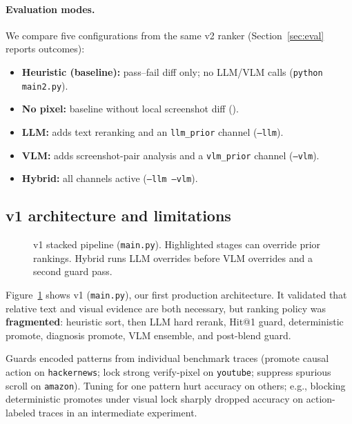 \documentclass[sigconf,nonacm]{acmart}
\begin{document}
\paragraph{Evaluation modes.}
We compare five configurations from the same v2 ranker (Section~\ref{sec:eval} reports outcomes):
\begin{itemize}
  \item \textbf{Heuristic (baseline):} pass--fail diff only; no LLM/VLM calls (\texttt{python main2.py}).
  \item \textbf{No pixel:} baseline without local screenshot diff ().
  \item \textbf{LLM:} adds text reranking and an \texttt{llm\_prior} channel (\texttt{--llm}).
  \item \textbf{VLM:} adds screenshot-pair analysis and a \texttt{vlm\_prior} channel (\texttt{--vlm}).
  \item \textbf{Hybrid:} all channels active (\texttt{--llm --vlm}).
\end{itemize}

\subsection{v1 architecture and limitations}
\label{sec:v1}

\begin{figure}[t]
  \centering
  \resizebox{0.92\linewidth}{!}{%
  }
  \caption{v1 stacked pipeline (\texttt{main.py}). Highlighted stages can override prior rankings. Hybrid runs LLM overrides before VLM overrides and a second guard pass.}
  \label{fig:arch-v1}
\end{figure}

Figure~\ref{fig:arch-v1} shows v1 (\texttt{main.py}), our first production architecture.
It validated that relative text and visual evidence are both necessary, but ranking policy was \textbf{fragmented}:
heuristic sort, then LLM hard rerank, Hit@1 guard, deterministic promote, diagnosis promote, VLM ensemble, and post-blend guard.

Guards encoded patterns from individual benchmark traces (promote causal action on \texttt{hackernews}; lock strong verify-pixel on \texttt{youtube}; suppress spurious scroll on \texttt{amazon}).
Tuning for one pattern hurt accuracy on others; e.g., blocking deterministic promotes under visual lock sharply dropped accuracy on action-labeled traces in an intermediate experiment.
\end{document}
